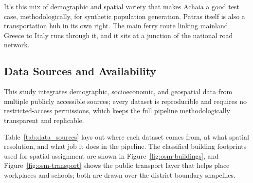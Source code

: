 \documentclass{article}
\begin{document}
It's this mix of demographic and spatial variety that makes Achaia a good test case, methodologically, for synthetic population generation. Patras itself is also a transportation hub in its own right. The main ferry route linking mainland Greece to Italy runs through it, and it sits at a junction of the national road network.

\subsection{Data Sources and Availability}\label{data-sources-and-availability}

This study integrates demographic, socioeconomic, and geospatial data from multiple publicly accessible sources; every dataset is reproducible and requires no restricted-access permissions, which keeps the full pipeline methodologically transparent and replicable.

Table~\ref{tab:data_sources} lays out where each dataset comes from, at what spatial resolution, and what job it does in the pipeline. The classified building footprints used for spatial assignment are shown in Figure~\ref{fig:osm-buildings}, and Figure~\ref{fig:osm-transport} shows the public transport layer that helps place workplaces and schools; both are drawn over the district boundary shapefiles.
\end{document}
